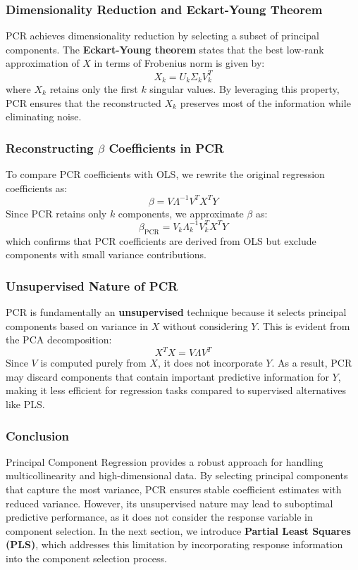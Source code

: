 \documentclass[11pt,twoside,a4paper]{article}
\begin{document}
\subsubsection{Dimensionality Reduction and Eckart-Young Theorem}
PCR achieves dimensionality reduction by selecting a subset of principal components. The \textbf{Eckart-Young theorem} states that the best low-rank approximation of \( X \) in terms of Frobenius norm is given by:
\[
X_k = U_k \Sigma_k V_k^T
\]
where \( X_k \) retains only the first \( k \) singular values. By leveraging this property, PCR ensures that the reconstructed \( X_k \) preserves most of the information while eliminating noise.

\subsubsection{Reconstructing \( \beta \) Coefficients in PCR}
To compare PCR coefficients with OLS, we rewrite the original regression coefficients as:
\[
\beta = V \Lambda^{-1} V^T X^T Y
\]
Since PCR retains only \( k \) components, we approximate \( \beta \) as:
\[
\beta_{\text{PCR}} = V_k \Lambda_k^{-1} V_k^T X^T Y
\]
which confirms that PCR coefficients are derived from OLS but exclude components with small variance contributions.

\subsubsection{Unsupervised Nature of PCR}
PCR is fundamentally an \textbf{unsupervised} technique because it selects principal components based on variance in \( X \) without considering \( Y \). This is evident from the PCA decomposition:
\[
X^T X = V \Lambda V^T
\]
Since \( V \) is computed purely from \( X \), it does not incorporate \( Y \). As a result, PCR may discard components that contain important predictive information for \( Y \), making it less efficient for regression tasks compared to supervised alternatives like PLS.

\subsubsection{Conclusion}
Principal Component Regression provides a robust approach for handling multicollinearity and high-dimensional data. By selecting principal components that capture the most variance, PCR ensures stable coefficient estimates with reduced variance. However, its unsupervised nature may lead to suboptimal predictive performance, as it does not consider the response variable in component selection. In the next section, we introduce \textbf{Partial Least Squares (PLS)}, which addresses this limitation by incorporating response information into the component selection process.
\end{document}
